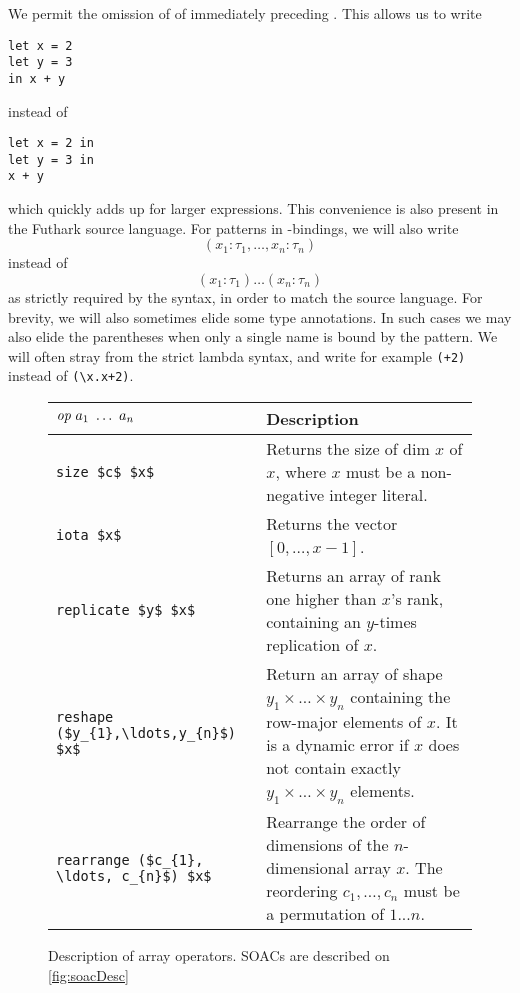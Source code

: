 We permit the omission of of  immediately preceding .
This allows us to write
\begin{lstlisting}
let x = 2
let y = 3
in x + y
\end{lstlisting}
  instead of
\begin{lstlisting}
let x = 2 in
let y = 3 in
x + y
\end{lstlisting}
  which quickly adds up for larger expressions.  This convenience is
  also present in the Futhark source language.  For patterns in
  -bindings, we will also write
\[
  (x_{1}: \tau_{1}, \ldots, x_{n}: \tau_{n})
\]
instead of
\[
  (x_{1}: \tau_{1}) \ldots (x_{n}: \tau_{n})
\]
as strictly required by the syntax, in order to match the source
language.  For brevity, we will also sometimes elide some type
annotations.  In such cases we may also elide the parentheses when
only a single name is bound by the pattern.  We will often stray from
the strict lambda syntax, and write for example \lstinline{(+2)}
instead of \lstinline{(\x.x+2)}.

\begin{figure}
\centering

\begin{tabular}{lp{58mm}}
  $\emph{op}~a_{1}~\ldots~a_{n}$ & Description \\ \hline
  \lstinline[mathescape]!size $c$ $x$! & Returns the size of dim $x$ of $x$, where $x$ must be a non-negative integer literal. \\
  \lstinline[mathescape]!iota $x$! & Returns the vector $[0,\ldots, x-1]$. \\
  \lstinline[mathescape]!replicate $y$ $x$! & Returns an array of rank one higher than $x$'s rank, containing an $y$-times replication of $x$.\\
  \lstinline[mathescape]!reshape ($y_{1},\ldots,y_{n}$) $x$! & Return an array of shape $y_{1}\times\ldots\times y_{n}$ containing the row-major elements of $x$.  It is a dynamic error if $x$ does not contain exactly $y_{1}\times\ldots\times y_{n}$ elements. \\
  \lstinline[mathescape]!rearrange ($c_{1}, \ldots, c_{n}$) $x$! & Rearrange the order of dimensions of the $n$-dimensional array $x$.  The reordering $c_{1}, \ldots, c_{n}$ must be a permutation of $1...n$. \\
\end{tabular}
\caption{Description of array operators.  SOACs are described on \cref{fig:soacDesc}}
\label{fig:arrayDesc}
\end{figure}

